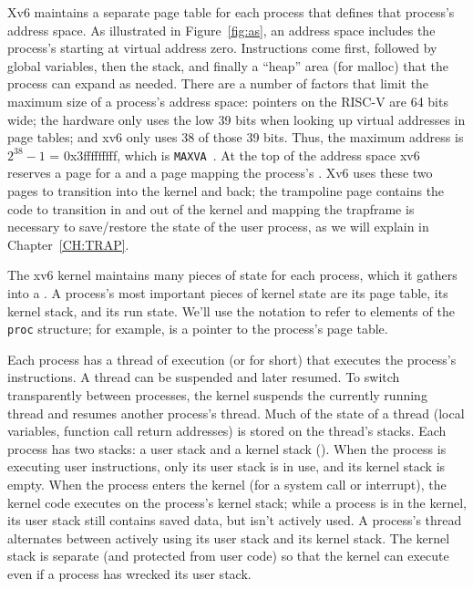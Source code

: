 Xv6 maintains a separate page table for each process that defines that process's
address space. As illustrated in 
Figure~\ref{fig:as},
an address space includes the process's
starting at virtual address zero. Instructions come first,
followed by global variables, then the stack,
and finally a ``heap'' area (for malloc)
that the process can expand as needed.
There are a number of factors that limit the
maximum size of a process's address space:
pointers on the RISC-V are 64 bits wide;
the hardware only uses the low 39 bits when
looking up virtual addresses in page tables;
and xv6 only uses 38 of those 39 bits.
Thus, the maximum address is $2^{38}-1$ =
0x3fffffffff, which is \lstinline{MAXVA}~.
At the top of the address space xv6 reserves a page
for a  and a page mapping
the process's .  Xv6 uses these two pages
to transition into the kernel and back;
the trampoline page contains the code to transition in and out
of the kernel and mapping the trapframe is necessary to save/restore the
state of the user process, as we will explain in Chapter~\ref{CH:TRAP}.

The xv6 kernel maintains many pieces of state for each process,
which it gathers into a
.
A process's most important pieces of kernel state are its 
page table, its kernel stack, and its run state.
We'll use the notation
to refer to elements of the
\lstinline{proc}
structure; for example,
 is a pointer to the process's page table.

Each process has a thread of execution (or 
for short) that executes the process's instructions.
A thread can be suspended and later resumed.
To switch transparently between processes,
the kernel suspends the currently running thread and resumes another process's
thread.  Much of the state of a thread (local variables, function call return
addresses) is stored on the thread's stacks.
Each process has two stacks: a user stack and a kernel stack
().
When the process is executing user instructions, only its user stack
is in use, and its kernel stack is empty.
When the process enters the kernel (for a system call or interrupt),
the kernel code executes on the process's kernel stack; while
a process is in the kernel, its user stack still contains saved
data, but isn't actively used.
A process's thread alternates between actively using its user stack
and its kernel stack. The kernel stack is separate (and protected from
user code) so that the kernel
can execute even if a process has wrecked its user stack.

